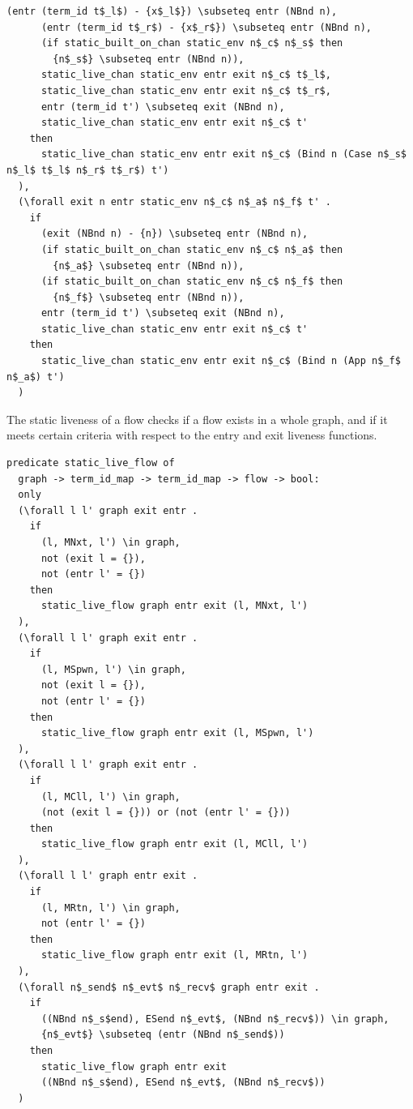 \documentclass[10pt]{article}
\begin{document}
\begin{lstlisting}[language=logic, mathescape]
      (entr (term_id t$_l$) - {x$_l$}) \subseteq entr (NBnd n),
      (entr (term_id t$_r$) - {x$_r$}) \subseteq entr (NBnd n),
      (if static_built_on_chan static_env n$_c$ n$_s$ then
        {n$_s$} \subseteq entr (NBnd n)),
      static_live_chan static_env entr exit n$_c$ t$_l$,
      static_live_chan static_env entr exit n$_c$ t$_r$,
      entr (term_id t') \subseteq exit (NBnd n),
      static_live_chan static_env entr exit n$_c$ t'
    then 
      static_live_chan static_env entr exit n$_c$ (Bind n (Case n$_s$ n$_l$ t$_l$ n$_r$ t$_r$) t')
  ),
  (\forall exit n entr static_env n$_c$ n$_a$ n$_f$ t' .
    if
      (exit (NBnd n) - {n}) \subseteq entr (NBnd n),
      (if static_built_on_chan static_env n$_c$ n$_a$ then
        {n$_a$} \subseteq entr (NBnd n)),
      (if static_built_on_chan static_env n$_c$ n$_f$ then
        {n$_f$} \subseteq entr (NBnd n)),
      entr (term_id t') \subseteq exit (NBnd n),
      static_live_chan static_env entr exit n$_c$ t'
    then
      static_live_chan static_env entr exit n$_c$ (Bind n (App n$_f$ n$_a$) t')
  )
\end{lstlisting}

The static liveness of a flow checks if a flow exists in a whole graph,
and if it meets certain criteria with respect to the entry and exit liveness
functions. 

\begin{lstlisting}[language=logic, mathescape]
  predicate static_live_flow of
  graph -> term_id_map -> term_id_map -> flow -> bool:
  only
  (\forall l l' graph exit entr . 
    if
      (l, MNxt, l') \in graph,
      not (exit l = {}),
      not (entr l' = {})
    then
      static_live_flow graph entr exit (l, MNxt, l')
  ),
  (\forall l l' graph exit entr .
    if
      (l, MSpwn, l') \in graph, 
      not (exit l = {}),
      not (entr l' = {})
    then
      static_live_flow graph entr exit (l, MSpwn, l')
  ),
  (\forall l l' graph exit entr .
    if
      (l, MCll, l') \in graph,
      (not (exit l = {})) or (not (entr l' = {}))
    then
      static_live_flow graph entr exit (l, MCll, l')
  ),
  (\forall l l' graph entr exit .
    if
      (l, MRtn, l') \in graph,
      not (entr l' = {})
    then
      static_live_flow graph entr exit (l, MRtn, l')
  ),
  (\forall n$_send$ n$_evt$ n$_recv$ graph entr exit .
    if
      ((NBnd n$_s$end), ESend n$_evt$, (NBnd n$_recv$)) \in graph, 
      {n$_evt$} \subseteq (entr (NBnd n$_send$))
    then
      static_live_flow graph entr exit
      ((NBnd n$_s$end), ESend n$_evt$, (NBnd n$_recv$))
  )
\end{lstlisting}
\end{document}

